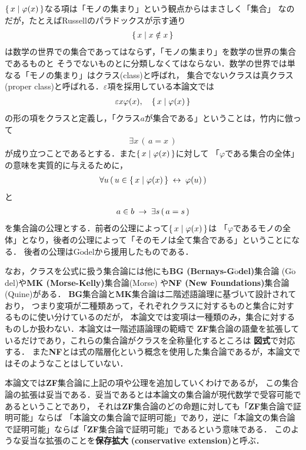 	$\{\, x \mid \varphi(x)\, \}$なる項は「モノの集まり」という観点からはまさしく「集合」
	なのだが，たとえばRussellのパラドックスが示す通り
	\begin{align}
		\{\, x \mid x \notin x\, \}
	\end{align}
	は数学の世界での集合であってはならず，「モノの集まり」を数学の世界の集合であるものと
	そうでないものとに分類しなくてはならない．数学の世界では単なる「モノの集まり」はクラス(class)と呼ばれ，
	集合でないクラスは真クラス(proper class)と呼ばれる．$\varepsilon$項を採用している本論文では
	\begin{align}
		\varepsilon x \varphi(x),\quad \{\, x \mid \varphi(x)\, \}
	\end{align}
	の形の項をクラスと定義し，「クラス$a$が集合である」ということは，竹内\cite{TakeuchiSet}に倣って
	\begin{align}
		\exists x\, (\, a = x\, )
	\end{align}
	が成り立つことであるとする．また$\{\, x \mid \varphi(x)\, \}$に対して
	「$\varphi$である集合の全体」の意味を実質的に与えるために，
	\begin{align}
		\forall u\, (\, u \in \{\, x \mid \varphi(x)\, \} \hspace{0.25em}\leftrightarrow\hspace{0.25em} \varphi(u)\, )
	\end{align}
	と
	\begin{align}
		a \in b \hspace{0.25em}\rightarrow\hspace{0.25em} \exists s\, (\, a = s\, )
	\end{align}
	を集合論の公理とする．前者の公理によって$\{\, x \mid \varphi(x)\, \}$は
	「$\varphi$であるモノの全体」となり，後者の公理によって「そのモノは全て集合である」ということになる．
	後者の公理はG$\ddot{\mbox{o}}$del\cite{Godel}から援用したものである．
	
	なお，クラスを公式に扱う集合論には他にも{\bf BG (Bernays-G$\ddot{\mbox{o}}$del)}集合論
	(G$\ddot{\mbox{o}}$del\cite{Godel})や{\bf MK (Morse-Kelly)}集合論(Morse\cite{Morse})
	や{\bf NF (New Foundations)}集合論(Quine\cite{Quine})がある．
	{\bf BG}集合論と{\bf MK}集合論は二階述語論理に基づいて設計されており，
	つまり変項が二種類あって，それぞれクラスに対するものと集合に対するものに使い分けているのだが，
	本論文では変項は一種類のみ，集合に対するものしか扱わない．本論文は一階述語論理の範疇で
	{\bf ZF}集合論の語彙を拡張しているだけであり，これらの集合論がクラスを全称量化するところは
	{\bf 図式}で対応する．
	また{\bf NF}とは式の階層化という概念を使用した集合論であるが，本論文ではそのようなことはしていない．
	
	本論文では{\bf ZF}集合論に上記の項や公理を追加していくわけであるが，
	この集合論の拡張は妥当である．妥当であるとは本論文の集合論が現代数学で受容可能であるということであり，
	それは{\bf ZF}集合論のどの命題に対しても「{\bf ZF}集合論で証明可能」ならば
	「本論文の集合論で証明可能」であり，逆に「本論文の集合論で証明可能」ならば「{\bf ZF}集合論で証明可能」であるという意味である．
	このような妥当な拡張のことを{\bf 保存拡大}
	{\bf (conservative extension)}と呼ぶ．
	

